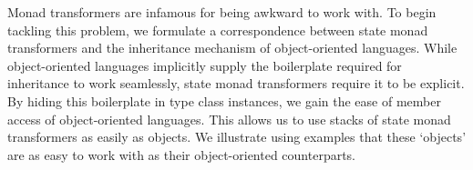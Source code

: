 


Monad transformers are infamous for being awkward to work with. To begin tackling this problem, we formulate a correspondence between state monad transformers and the inheritance mechanism of object-oriented languages. While object-oriented languages implicitly supply the boilerplate required for inheritance to work seamlessly, state monad transformers require it to be explicit. By hiding this boilerplate in type class instances, we gain the ease of member access of object-oriented languages. This allows us to use stacks of state monad transformers as easily as objects. We illustrate using examples that these `objects' are as easy to work with as their object-oriented counterparts.

